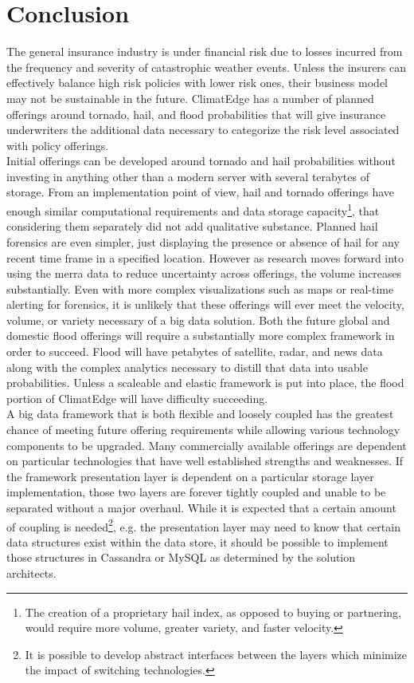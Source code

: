 \section{Conclusion}
The general insurance industry is under financial risk due to losses incurred from the frequency and severity of catastrophic weather events. Unless the insurers can effectively balance high risk policies with lower risk ones, their business model may not be sustainable in the future. ClimatEdge has a number of planned offerings around tornado, hail, and flood probabilities that will give insurance underwriters the additional data necessary to categorize the risk level associated with policy offerings.\\

Initial offerings can be developed around tornado and hail probabilities without investing in anything other than a modern server with several terabytes of storage. From an implementation point of view, hail and tornado offerings have enough similar computational requirements and data storage capacity\footnote{The creation of a proprietary hail index, as opposed to buying or partnering, would require more volume, greater variety, and faster velocity.}, that considering them separately did not add qualitative substance. Planned hail forensics are even simpler, just displaying the presence or absence of hail for any recent time frame in a specified location. However as research moves forward into using the \gls{merra} data to reduce uncertainty across offerings, the volume increases substantially. Even with more complex visualizations such as maps or real-time alerting for forensics, it is unlikely that these offerings will ever meet the velocity, volume, or variety necessary of a big data solution. Both the future global and domestic flood offerings will require a substantially more complex framework in order to succeed. Flood will have petabytes of satellite, radar, and news data along with the complex analytics necessary to distill that data into usable probabilities. Unless a scaleable and elastic framework is put into place, the flood portion of ClimatEdge will have difficulty succeeding.\\

A big data framework that is both flexible and loosely coupled has the greatest chance of meeting future offering requirements while allowing various technology components to be upgraded. Many commercially available offerings are dependent on particular technologies that have well established strengths and weaknesses. If the framework presentation layer is dependent on a particular storage layer implementation, those two layers are forever tightly coupled and unable to be separated without a major overhaul. While it is expected that a certain amount of coupling is needed\footnote{It is possible to develop abstract interfaces between the layers which minimize the impact of switching technologies.}, e.g. the presentation layer may need to know that certain data structures exist within the data store, it should be possible to implement those structures in Cassandra or MySQL as determined by the solution architects.\\

